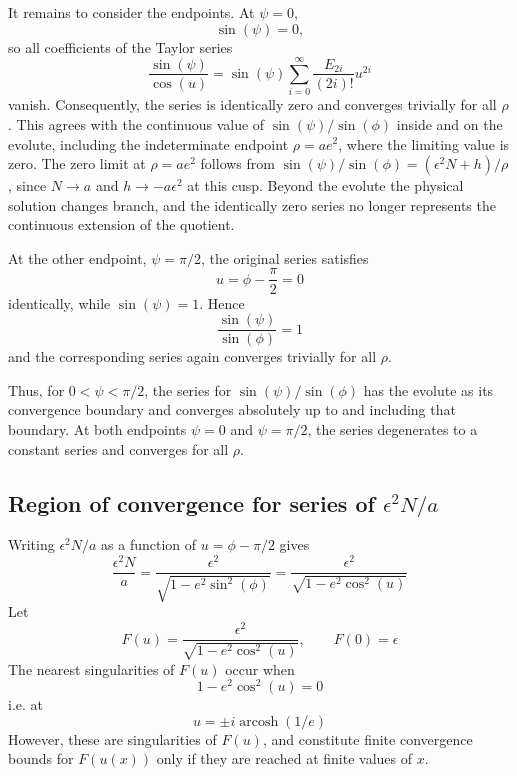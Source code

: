 \documentclass[a4paper]{amsart}
\begin{document}
It remains to consider the endpoints. At $\psi=0$,
\begin{equation*}
\sin(\psi)=0,
\end{equation*}
so all coefficients of the Taylor series
\begin{equation*}
\frac{\sin(\psi)}{\cos(u)}
=
\sin(\psi)\sum_{i=0}^{\infty}\frac{E_{2i}}{(2i)!}u^{2i}
\end{equation*}
vanish. Consequently, the series is identically zero and converges trivially for all $\rho$. This agrees with the continuous value of $\sin(\psi)/\sin(\phi)$ inside and on the evolute, including the indeterminate endpoint $\rho=ae^2$, where the limiting value is zero. The zero limit at $\rho=ae^2$ follows from
$\sin(\psi)/\sin(\phi)=(\epsilon^2N+h)/\rho$, since $N\to a$ and $h\to-a\epsilon^2$ at this cusp. Beyond the evolute the physical solution changes branch, and the identically zero series no longer represents the continuous extension of the quotient.

At the other endpoint, $\psi=\pi/2$, the original series satisfies
\begin{equation*}
u=\phi-\frac{\pi}{2}=0
\end{equation*}
identically, while $\sin(\psi)=1$. Hence
\begin{equation*}
\frac{\sin(\psi)}{\sin(\phi)}=1
\end{equation*}
and the corresponding series again converges trivially for all $\rho$.

Thus, for $0<\psi<\pi/2$, the series for $\sin(\psi)/\sin(\phi)$ has the evolute as its convergence boundary and converges absolutely up to and including that boundary. At both endpoints $\psi=0$ and $\psi=\pi/2$, the series degenerates to a constant series and converges for all $\rho$.


\subsection{Region of convergence for series of \texorpdfstring{$\epsilon^2N/a$}{ε²N/a}}\label{sec:roc_N}
Writing $\epsilon^2N/a$ as a function of $u=\phi-\pi/2$ gives
\begin{equation*}
\frac{\epsilon^2N}{a}
=
\frac{\epsilon^2}{\sqrt{1-e^2\sin^2(\phi)}}
=
\frac{\epsilon^2}{\sqrt{1-e^2\cos^2(u)}}
\end{equation*}
Let
\begin{equation*}
F(u)
=
\frac{\epsilon^2}{\sqrt{1-e^2\cos^2(u)}}, \qquad F(0)=\epsilon
\end{equation*}
The nearest singularities of $F(u)$ occur when
\begin{equation*}
1-e^2\cos^2(u)=0
\end{equation*}
i.e. at
\begin{equation*}
u=\pm i\operatorname{arcosh}(1/e)
\end{equation*}
However, these are singularities of $F(u)$, and constitute finite convergence bounds for $F(u(x))$ only if they are reached at finite values of $x$.
\end{document}
